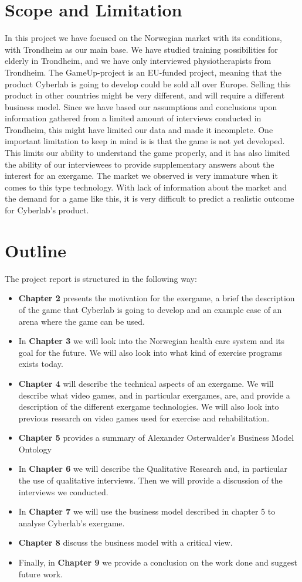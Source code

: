 \section{Scope and Limitation}
In this project we have focused on the Norwegian market with its conditions, with Trondheim as our main base. We have studied training possibilities for elderly in Trondheim, and we have only interviewed physiotherapists from Trondheim. The GameUp-project is an EU-funded project, meaning that the product Cyberlab is going to develop could be sold all over Europe.  Selling this product in other countries might be very different, and will require a different business model. Since we have based our assumptions and conclusions upon information gathered from a limited amount of interviews conducted in Trondheim, this might have limited our data and made it incomplete. One important limitation to keep in mind is is that the game is not yet developed. This limits our ability to understand the game properly, and it has also limited the ability of our interviewees to provide supplementary answers about the interest for an exergame.  The market we observed is very immature when it comes to this type technology. With lack of information about the market and the demand for a game like this, it is very difficult to predict a realistic outcome for Cyberlab’s product.

\section{Outline}
The project report is structured in the following way:
\begin{itemize}
\renewcommand{\labelitemi}{$\bullet$}
\item \textbf{Chapter 2} presents the motivation for the exergame, a brief the description of the game that Cyberlab is going to develop and an example case of an arena where the game can be used.
\item In \textbf{Chapter 3} we will look into the Norwegian health care system and its goal for the future. We will also look into what kind of exercise programs exists today.
\item	\textbf{Chapter 4} will describe the technical aspects of an exergame. We will describe what video games, and in particular exergames, are, and provide a description of the different exergame technologies. We will also look into previous research on video games used for exercise and rehabilitation.
\item	\textbf{Chapter 5} provides a summary of Alexander Osterwalder's Business Model Ontology
\item	In \textbf{Chapter 6} we will describe the Qualitative Research and, in particular the use of qualitative interviews. Then we will provide a discussion of the interviews we conducted.
\item In \textbf{Chapter 7} we will use the business model described in chapter 5 to analyse Cyberlab's exergame.
\item  \textbf{Chapter 8} discuss the business model with a critical view.
\item Finally, in \textbf{Chapter 9} we provide a conclusion on the work done and suggest future work.
\end{itemize}